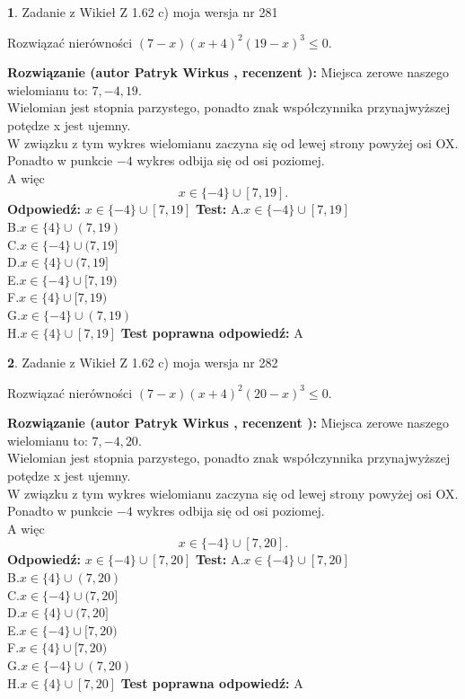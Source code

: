 \documentclass[12pt, a4paper]{article}
\theoremstyle{definition} %
\newtheorem{zad}{}
\newcommand{\zadStart}[1]{\begin{zad}#1\newline}
\newcommand{\zadStop}{\end{zad}}
\newcommand{\rozwStart}[2]{\noindent \textbf{Rozwiązanie (autor #1 , recenzent #2): }\newline}
\newcommand{\rozwStop}{\newline}
\newcommand{\odpStart}{\noindent \textbf{Odpowiedź:}\newline}
\newcommand{\odpStop}{\newline}
\newcommand{\testStart}{\noindent \textbf{Test:}\newline}
\newcommand{\testStop}{\newline}
\newcommand{\kluczStart}{\noindent \textbf{Test poprawna odpowiedź:}\newline}
\newcommand{\kluczStop}{\newline}
\begin{document}
\zadStart{Zadanie z Wikieł Z 1.62 c) moja wersja nr 281}

Rozwiązać nierówności $(7-x)(x+4)^{2}(19-x)^{3}\le0$.
\zadStop
\rozwStart{Patryk Wirkus}{}
Miejsca zerowe naszego wielomianu to: $7, -4, 19$.\\
Wielomian jest stopnia parzystego, ponadto znak współczynnika przy\linebreak najwyższej potędze x jest ujemny.\\ W związku z tym wykres wielomianu zaczyna się od lewej strony powyżej osi OX.\\
Ponadto w punkcie $-4$ wykres odbija się od osi poziomej.\\
A więc $$x \in \{-4\} \cup [7,19].$$
\rozwStop
\odpStart
$x \in \{-4\} \cup [7,19]$
\odpStop
\testStart
A.$x \in \{-4\} \cup [7,19]$\\
B.$x \in \{4\} \cup (7,19)$\\
C.$x \in \{-4\} \cup (7,19]$\\
D.$x \in \{4\} \cup (7,19]$\\
E.$x \in \{-4\} \cup [7,19)$\\
F.$x \in \{4\} \cup [7,19)$\\
G.$x \in \{-4\} \cup (7,19)$\\
H.$x \in \{4\} \cup [7,19]$
\testStop
\kluczStart
A
\kluczStop



\zadStart{Zadanie z Wikieł Z 1.62 c) moja wersja nr 282}

Rozwiązać nierówności $(7-x)(x+4)^{2}(20-x)^{3}\le0$.
\zadStop
\rozwStart{Patryk Wirkus}{}
Miejsca zerowe naszego wielomianu to: $7, -4, 20$.\\
Wielomian jest stopnia parzystego, ponadto znak współczynnika przy\linebreak najwyższej potędze x jest ujemny.\\ W związku z tym wykres wielomianu zaczyna się od lewej strony powyżej osi OX.\\
Ponadto w punkcie $-4$ wykres odbija się od osi poziomej.\\
A więc $$x \in \{-4\} \cup [7,20].$$
\rozwStop
\odpStart
$x \in \{-4\} \cup [7,20]$
\odpStop
\testStart
A.$x \in \{-4\} \cup [7,20]$\\
B.$x \in \{4\} \cup (7,20)$\\
C.$x \in \{-4\} \cup (7,20]$\\
D.$x \in \{4\} \cup (7,20]$\\
E.$x \in \{-4\} \cup [7,20)$\\
F.$x \in \{4\} \cup [7,20)$\\
G.$x \in \{-4\} \cup (7,20)$\\
H.$x \in \{4\} \cup [7,20]$
\testStop
\kluczStart
A
\kluczStop
\end{document}
